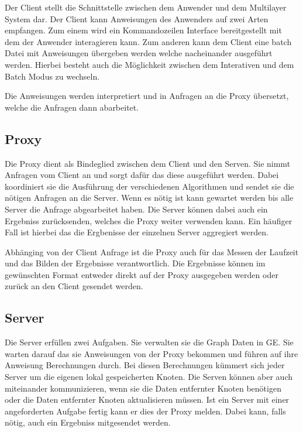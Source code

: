 Der Client stellt die Schnittstelle zwischen dem Anwender und dem Multilayer System dar. Der Client kann Anweisungen des Anwenders auf zwei Arten empfangen.
Zum einem wird ein Kommandozeilen Interface bereitgestellt mit dem der Anwender interagieren kann. Zum anderen kann dem Client eine batch Datei mit Anweisungen übergeben werden
welche nacheinander ausgeführt werden.
Hierbei besteht auch die Möglichkeit zwischen dem Interativen und dem Batch Modus zu wechseln.

Die Anweisungen werden interpretiert und in Anfragen an die Proxy übersetzt, welche die Anfragen dann abarbeitet.

\subsection{Proxy}

Die Proxy dient als Bindeglied zwischen dem Client und den Serven. Sie nimmt Anfragen vom Client an und sorgt dafür das diese ausgeführt werden.
Dabei koordiniert sie die Ausführung der verschiedenen Algorithmen und sendet sie die nötigen Anfragen an die Server. Wenn es nötig ist kann gewartet werden 
bis alle Server die Anfrage abgearbeitet haben. Die Server können dabei auch ein Ergebniss zurücksenden, welches die Proxy weiter verwenden kann. Ein häufiger Fall
ist hierbei das die Ergbenisse der einzelnen Server aggregiert werden.


Abhänging von der Client Anfrage ist die Proxy auch für das Messen der Laufzeit und das Bilden der Ergebnisse verantwortlich. Die Ergebnisse können im gewünschten Format entweder direkt auf der Proxy ausgegeben werden
oder zurück an den Client gesendet werden.

\subsection{Server}

Die Server erfüllen zwei Aufgaben. Sie verwalten sie die Graph Daten in GE.
Sie warten darauf das sie Anweisungen von der Proxy bekommen und führen auf ihre Anweisung Berechnungen durch. Bei diesen Berechnungen kümmert sich jeder Server 
um die eigenen lokal gespeicherten Knoten. Die Serven können aber auch miteinander kommunizieren, wenn sie die Daten entfernter Knoten benötigen oder die Daten entfernter Knoten
aktualisieren müssen.
Ist ein Server mit einer angeforderten Aufgabe fertig kann er dies der Proxy melden. Dabei kann, falls nötig, auch ein Ergebniss mitgesendet werden.



